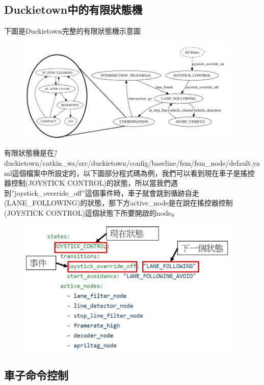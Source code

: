 \documentclass{article}
\begin{document}
\subsection{Duckietown中的有限狀態機}

下圖是Duckietown完整的有限狀態機示意圖

\begin{figure}[htp]
    \begin{center}
        \includegraphics[width=300pt]{pic/圖片26.jpg}
    \end{center}
\end{figure}

有限狀態機是在\~/duckietown/catkin\_ws/src/duckietown/config/baseline/fsm/fsm\_node/default.yaml這個檔案中所設定的，以下圖部分程式碼為例，我們可以看到現在車子是搖控器控制(JOYSTICK CONTROL)的狀態，所以當我們遇到”joystick\_override\_off”這個事件時，車子就會跳到循跡自走(LANE\_FOLLOWING)的狀態，那下方active\_node是在說在搖控器控制(JOYSTICK CONTROL)這個狀態下所要開啟的node。
\\

\begin{figure}[htp]
    \begin{center}
        \includegraphics[width=300pt]{pic/圖片27.jpg}
    \end{center}
\end{figure}

\subsection{車子命令控制}
\end{document}
